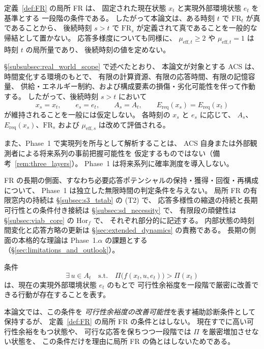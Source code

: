 \begin{remark}[局所 FR と長期の側面の時間的区別]
\label{rem:sd_local_scope}
定義~\ref{def:FR} の局所 FR は、
固定された現在状態 $x_t$ と実現外部環境状態 $e_t$ を基準とする
一段階の条件である。
したがって本論文は、ある時刻 $t$ で $\mathrm{FR}_t$ が真であることから、
後続時刻 $s>t$ で $\mathrm{FR}_s$ が定義されて真であることを一般的な帰結として置かない。
応答多様度についても同様に、
$\mu_{\mathrm{eff},t}\ge2$ や $\mu_{\mathrm{eff},t}=1$ は時刻 $t$ の局所量であり、
後続時刻の値を定めない。

\S\ref{subsubsec:real_world_scope} で述べたとおり、
本論文が対象とする ACS は、時間変化する環境のもとで、
有限の計算資源、有限の応答時間、有限の記憶容量、
供給・エネルギー制約、および構成要素の損傷・劣化可能性を伴って作動する。
したがって、後続時刻 $s>t$ において
\[
  x_s=x_t,\qquad
  e_s=e_t,\qquad
  A_s=A_t,\qquad
  E_{\mathrm{req}}(x_s)=E_{\mathrm{req}}(x_t)
\]
が維持されることを一般には仮定しない。
各時刻の $x_s$ と $e_s$ に応じて、
$A_s$、$E_{\mathrm{req}}(x_s)$、$\mathrm{FR}_s$ および
$\mu_{\mathrm{eff},s}$ は改めて評価される。

また、Phase~1 で実現列を所与として解析することは、
ACS 自身または外部観測者による将来系列の事前把握可能性を
仮定するものではない（備考~\ref{rem:three_layers}）。
Phase~1 は将来系列に確率測度を導入しない。

FR の長期の側面、すなわち必要応答ポテンシャルの保持・獲得・回復・再構成について、
Phase~1 は独立した無限時間の判定条件を与えない。
局所 FR の有限窓内の持続は \S\ref{subsec:s3_tstab} の (T2) で、
応答多様性の縮退の持続と長期可行性との条件付き接続は
\S\ref{subsec:sd_necessity} で、
有限段の頑健性は \S\ref{subsec:viab_core} の $\mathrm{Hor}_f$ で、
それぞれ部分的に記述する。
内部状態の時刻間変化と応答方略の更新は
\S\ref{sec:extended_dynamics} の責務である。
長期の側面の本格的な理論は Phase~1.$\alpha$ の課題とする
（\S\ref{sec:limitations_and_outlook}）。
\end{remark}

\begin{remark}[可行性余裕度の改善可能性]
\label{rem:sd_improvement_aux}
条件
\[
  \exists\,u\in A_t
  \quad\text{s.t.}\quad
  \Pi\bigl(f(x_t,u,e_t)\bigr)>\Pi(x_t)
\]
は、現在の実現外部環境状態 $e_t$ のもとで
可行性余裕度を一段階で厳密に改善できる行動が存在することを表す。

本論文では、この条件を
\emph{可行性余裕度の改善可能性}を表す補助診断条件として保持するが、
定義~\ref{def:FR} の局所 FR の条件とはしない。
現在すでに高い可行性余裕をもつ状態や、
可行な応答を保ちつつ一段階では
$\Pi$ を厳密増加させない状態を、
この条件だけを理由に局所 FR の偽とはしないためである。
\end{remark}

